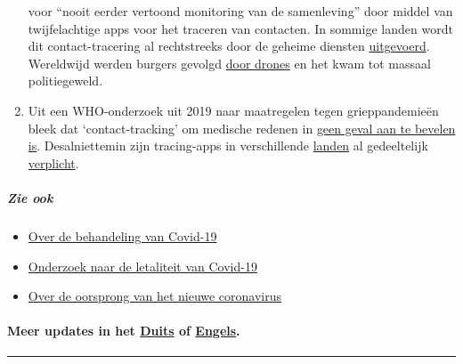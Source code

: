 \begin{enumerate}
  voor ``nooit eerder vertoond monitoring van de samenleving'' door
  middel van twijfelachtige apps voor het traceren van contacten. In
  sommige landen wordt dit contact-tracering al rechtstreeks door de
  geheime diensten
  \href{https://www.jewishpress.com/news/the-courts/state-to-high-court-even-more-shin-bet-involvement-in-fighting-the-coronavirus/2020/04/14/}{uitgevoerd}.
  Wereldwijd werden burgers gevolgd
  \href{https://off-guardian.org/2020/04/25/50-headlines-darker-more-of-the-new-normal/}{door
  drones} en het kwam tot massaal politiegeweld.
\item
  Uit een WHO-onderzoek uit 2019 naar maatregelen tegen grieppandemieën
  bleek dat `contact-tracking' om medische redenen in
  \href{https://apps.who.int/iris/bitstream/handle/10665/329438/9789241516839-eng.pdf\#page=9}{geen
  geval aan te bevelen is}. Desalniettemin zijn tracing-apps in
  verschillende
  \href{https://www.heise.de/tp/features/CuidAR-Argentinien-ueberwacht-mit-einer-App-4720143.html}{landen}
  al gedeeltelijk
  \href{https://www.technologyreview.com/2020/05/07/1001360/india-aarogya-setu-covid-app-mandatory/}{verplicht}.
\end{enumerate}

\hypertarget{zie-ook}{%
\subparagraph{\texorpdfstring{\textbf{Zie
ook}}{Zie ook}}\label{zie-ook}}

\begin{itemize}
\tightlist
\item
  \href{https://swprs.org/on-the-treatment-of-covid-19/}{Over de
  behandeling van Covid-19}
\item
  \href{https://swprs.org/studies-on-covid-19-lethality/}{Onderzoek naar
  de letaliteit van Covid-19}
\item
  \href{https://swprs.org/covid-19-virus-origin-the-mojiang-miners-passage-hypothesis/}{Over
  de oorsprong van het nieuwe coronavirus}
\end{itemize}

\hypertarget{meer-updates-in-het-duits-of-engels}{%
\paragraph{\texorpdfstring{Meer updates in het
\href{https://swprs.org/covid-19-hinweis-ii/}{Duits} of
\href{https://swprs.org/a-swiss-doctor-on-covid-19/}{Engels}.}{Meer updates in het Duits of Engels.}}\label{meer-updates-in-het-duits-of-engels}}

\begin{center}\rule{0.5\linewidth}{\linethickness}\end{center}

